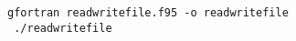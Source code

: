 \begin{Verbatim}[frame=lines,label=readwritefile - commands and output]
 gfortran readwritefile.f95 -o readwritefile
 ./readwritefile
\end{Verbatim}
